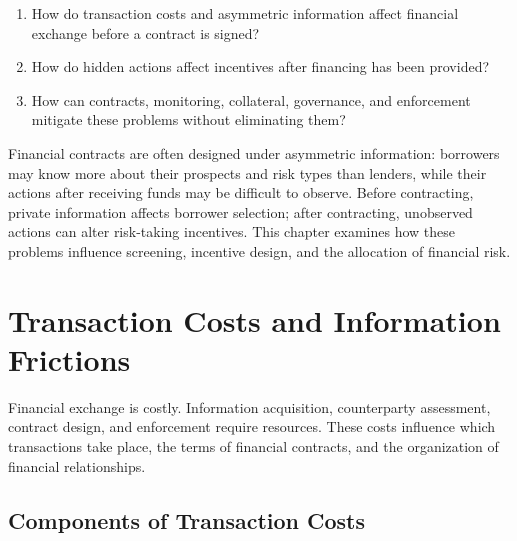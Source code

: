 \begin{tcolorbox}[
  enhanced,
  colback=FinanceBlue!6,
  colframe=FinanceBlue,
  boxrule=0.6pt,
  sharp corners,
  left=8pt,
  right=8pt,
  top=7pt,
  bottom=7pt,
  before skip=1em,
  after skip=1.6em,
  title=\textbf{Core Questions},
  coltitle=white,
  colbacktitle=FinanceBlue,
  fonttitle=\bfseries,
  attach boxed title to top left={xshift=6pt,yshift=-2mm},
  boxed title style={
    boxrule=0pt,
    sharp corners,
    left=5pt,
    right=5pt,
    top=2pt,
    bottom=2pt
  }
]
\begin{enumerate}[
  leftmargin=*,
  label=\textcolor{FinanceBlue}{\textbf{\arabic*.}},
  itemsep=0.55em,
  topsep=0.2em
]
\item How do transaction costs and asymmetric information affect financial exchange before a contract is signed?

\item How do hidden actions affect incentives after financing has been provided?

\item How can contracts, monitoring, collateral, governance, and enforcement mitigate these problems without eliminating them?

\end{enumerate}
\end{tcolorbox}

Financial contracts are often designed under asymmetric information: borrowers may know more about their prospects and risk types than lenders, while their actions after receiving funds may be difficult to observe. Before contracting, private information affects borrower selection; after contracting, unobserved actions can alter risk-taking incentives. This chapter examines how these problems influence screening, incentive design, and the allocation of financial risk.

\section{Transaction Costs and Information Frictions}

Financial exchange is costly. Information acquisition, counterparty assessment, contract design, and enforcement require resources. These costs influence which transactions take place, the terms of financial contracts, and the organization of financial relationships.

\subsection{Components of Transaction Costs}

